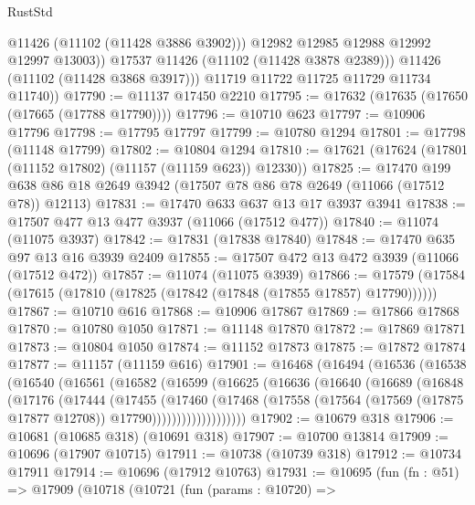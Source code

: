 \begin{lexlean}{RustStd}
\begin{coremodule}
                  @11426
                  (@11102 (@11428 @3886 @3902)))
                @12982
                @12985
                @12988
                @12992
                @12997
                @13003))
            @17537
            @11426
            (@11102 (@11428 @3878 @2389)))
          @11426
          (@11102 (@11428 @3868 @3917)))
        @11719
        @11722
        @11725
        @11729
        @11734
        @11740))
@17790 := @11137 @17450 @2210
@17795 := @17632 (@17635 (@17650 (@17665 (@17788 @17790))))
@17796 := @10710 @623
@17797 := @10906 @17796
@17798 := @17795 @17797
@17799 := @10780 @1294
@17801 := @17798 (@11148 @17799)
@17802 := @10804 @1294
@17810 := @17621 (@17624 (@17801 (@11152 @17802) (@11157 (@11159 @623)) @12330))
@17825 := @17470
    @199
    @638
    @86
    @18
    @2649
    @3942
    (@17507 @78 @86 @78 @2649 (@11066 (@17512 @78)) @12113)
@17831 := @17470 @633 @637 @13 @17 @3937 @3941
@17838 := @17507 @477 @13 @477 @3937 (@11066 (@17512 @477))
@17840 := @11074 (@11075 @3937)
@17842 := @17831 (@17838 @17840)
@17848 := @17470 @635 @97 @13 @16 @3939 @2409
@17855 := @17507 @472 @13 @472 @3939 (@11066 (@17512 @472))
@17857 := @11074 (@11075 @3939)
@17866 := @17579 (@17584 (@17615 (@17810 (@17825 (@17842 (@17848 (@17855 @17857) @17790))))))
@17867 := @10710 @616
@17868 := @10906 @17867
@17869 := @17866 @17868
@17870 := @10780 @1050
@17871 := @11148 @17870
@17872 := @17869 @17871
@17873 := @10804 @1050
@17874 := @11152 @17873
@17875 := @17872 @17874
@17877 := @11157 (@11159 @616)
@17901 := @16468
    (@16494
      (@16536
        (@16538
          (@16540
            (@16561
              (@16582
                (@16599
                  (@16625
                    (@16636
                      (@16640
                        (@16689
                          (@16848
                            (@17176
                              (@17444
                                (@17455
                                  (@17460
                                    (@17468
                                      (@17558
                                        (@17564
                                          (@17569 (@17875 @17877 @12708))
                                          @17790)))))))))))))))))))
@17902 := @10679 @318
@17906 := @10681 (@10685 @318) (@10691 @318)
@17907 := @10700 @13814
@17909 := @10696 (@17907 @10715)
@17911 := @10738 (@10739 @318)
@17912 := @10734 @17911
@17914 := @10696 (@17912 @10763)
@17931 := @10695
    (fun (fn : @51) =>
    @17909
      (@10718
        (@10721
          (fun (params : @10720) =>

\end{coremodule}
\end{lexlean}
